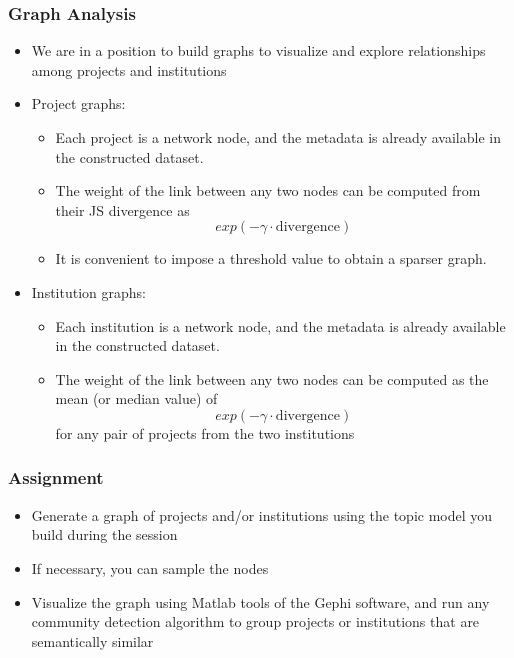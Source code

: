 \documentclass{beamer}
\begin{document}
\begin{frame}

    \frametitle{Graph Analysis}

	\begin{itemize}
  
    	\item We are in a position to build graphs to visualize and explore relationships among projects and institutions
    	
    	\item Project graphs:

	    	\begin{itemize}
	    		\item Each project is a network node, and the metadata is already available in the constructed dataset.
	    		\item The weight of the link between any two nodes can be computed from their JS divergence as
	    		$$exp(-\gamma \cdot \text{divergence})$$
	    		\item It is convenient to impose a threshold value to obtain a sparser graph.
    		\end{itemize}
    
    	\item Institution graphs:
    	
    		 \begin{itemize}
    		    		\item Each institution is a network node, and the metadata is already available in the constructed dataset.
    		    		\item The weight of the link between any two nodes can be computed as the mean (or median value) of 
    		    		$$exp(-\gamma \cdot \text{divergence})$$
    		    		for any pair of projects from the two institutions
    	    \end{itemize}
    \end{itemize}

\end{frame}


\begin{frame}

    \frametitle{Assignment}

	\begin{itemize}
  
    	\item Generate a graph of projects and/or institutions using the topic model you build during the session
    	\item If necessary, you can sample the nodes
    	\item Visualize the graph using Matlab tools of the Gephi software, and run any community detection algorithm to group projects or institutions that are semantically similar
    	
    \end{itemize}

\end{frame}
\end{document}
